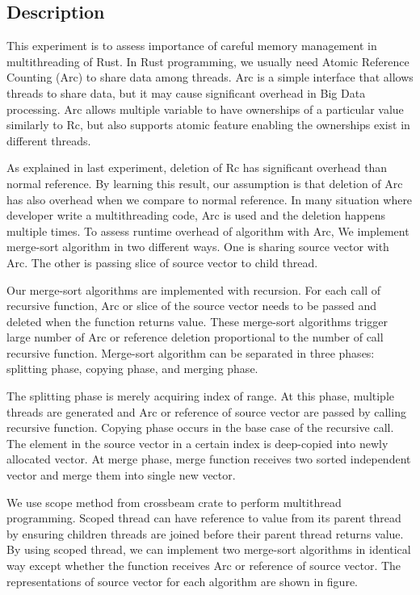 \subsection{Description}
This experiment is to assess importance of careful memory management in multithreading of Rust. 
In Rust programming, we usually need Atomic Reference Counting (Arc) to share data among threads. 
Arc is a simple interface that allows threads to share data, but it may cause significant overhead in Big Data processing.
Arc allows multiple variable to have ownerships of a particular value similarly to Rc, 
but also supports atomic feature enabling the ownerships exist in different threads. 

As explained in last experiment, deletion of Rc has significant overhead than normal reference. 
By learning this result, our assumption is that deletion of Arc has also overhead when we compare to normal reference. 
In many situation where developer write a multithreading code, Arc is used and the deletion happens multiple times. 
To assess runtime overhead of algorithm with Arc, We implement merge-sort algorithm in two different ways. 
One is sharing source vector with Arc. The other is passing slice of source vector to child thread. 

Our merge-sort algorithms are implemented with recursion. For each call of recursive function, 
Arc or slice of the source vector needs to be passed and deleted when the function returns value. 
These merge-sort algorithms trigger large number of Arc or reference deletion proportional to the number of call recursive function.
Merge-sort algorithm can be separated in three phases: splitting phase, copying phase, and merging phase. 

The splitting phase is merely acquiring index of range. At this phase, multiple threads are generated and Arc or reference of source vector are passed by calling recursive function. 
Copying phase occurs in the base case of the recursive call. The element in the source vector in a certain index is deep-copied into newly allocated vector.
At merge phase, merge function receives two sorted independent vector and merge them into single new vector.

We use scope method from crossbeam crate to perform multithread programming. 
Scoped thread can have reference to value from its parent thread by ensuring children threads are joined before their parent thread returns value. 
By using scoped thread, we can implement two merge-sort algorithms in identical way except whether the function receives Arc or reference of source vector.
The representations of source vector for each algorithm are shown in figure.

